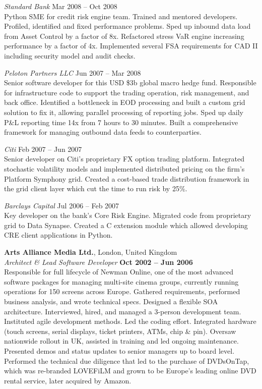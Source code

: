 \documentclass[margin,line]{resume}
\begin{document}
\begin{resume}
    \textsl{Standard Bank} \hfill Mar 2008 -- Oct 2008\\
    Python SME for credit risk engine team. Trained and mentored developers. Profiled, identified and fixed performance
    problems. Sped up inbound data load from Asset Control by a factor of 8x. Refactored stress VaR engine increasing performance by
    a factor of 4x. Implemented several FSA requirements for CAD II including security model and audit checks.     

    \textsl{Peloton Partners LLC} \hfill Jun 2007 -- Mar 2008\\
	Senior software developer for this USD \$3b global macro hedge fund. Responsible for infrastructure code to 
	support the trading operation, risk management, and back office. Identified a bottleneck in EOD processing and built a 
	custom grid solution to fix it, allowing parallel processing of reporting jobs. Sped up daily P\&L reporting time 14x 
	from 7 hours to 30 minutes. Built a comprehensive framework for managing outbound data feeds to counterparties.
	
    \textsl{Citi} \hfill Feb 2007 -- Jun 2007\\
	Senior developer on Citi's proprietary FX option trading platform. Integrated stochastic volatility models and implemented
	distributed pricing on the firm's Platform Symphony grid. Created a cost-based trade distribution framework in the grid client layer which
	cut the time to run risk by 25\%.
	
    \textsl{Barclays Capital} \hfill Jul 2006 -- Feb 2007\\
	Key developer on the bank’s Core Risk Engine. Migrated code from proprietary grid to Data Synapse. 
	Created a C extension module which allowed developing CRE client applications in Python.
	
    \textbf{Arts Alliance Media Ltd.}, London, United Kingdom \vspace{2mm}\\\vspace{1mm}%
    \textsl{Architect \& Lead Software Developer} \hfill \textbf{Oct 2002 -- Jun 2006}\\
	Responsible for full lifecycle of Newman Online, one of the most advanced software packages for managing 
 	multi-site cinema groups, currently running operations for 150 screens across Europe. Gathered requirements, 
 	performed business analysis, and wrote technical specs. Designed a flexible SOA architecture. 
	Interviewed, hired, and managed a 3-person development team. Instituted agile development methods. 
	Led the coding effort. Integrated hardware (touch screens, serial displays, ticket printers, ATMs, chip \& pin).  
	Oversaw nationwide rollout in UK, assisted in training and led ongoing maintenance. Presented demos and status updates to 
	senior managers up to board level. Performed the technical due diligence that led to the purchase of DVDsOnTap, which was 
	re-branded LOVEFiLM and grown to be Europe's leading online DVD rental service, later acquired by Amazon.


\end{resume}
\end{document}
